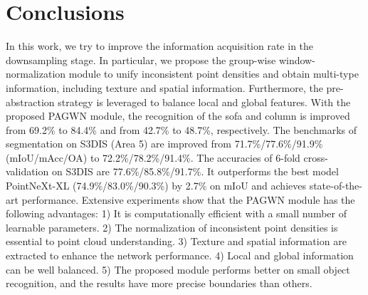 \documentclass[10pt,twocolumn,letterpaper]{article}
\begin{document}
\section{Conclusions}
    \label{sec:4}
    In this work, we try to improve the information acquisition rate in the downsampling stage.
    In particular, we propose the group-wise window-normalization module to unify inconsistent point densities and obtain multi-type information, including texture and spatial information.
    Furthermore, the pre-abstraction strategy is leveraged to balance local and global features.
    With the proposed PAGWN module, the recognition of the sofa and column is improved from 69.2\% to 84.4\% and from 42.7\% to 48.7\%, respectively.
    The benchmarks of segmentation on S3DIS (Area 5) are improved from 71.7\%/77.6\%/91.9\% (mIoU/mAcc/OA) to 72.2\%/78.2\%/91.4\%.
    The accuracies of 6-fold cross-validation on S3DIS are 77.6\%/85.8\%/91.7\%.
    It outperforms the best model PointNeXt-XL \cite{45https://doi.org/10.48550/arxiv.2206.04670} (74.9\%/83.0\%/90.3\%) by 2.7\% on mIoU and achieves state-of-the-art performance.
    Extensive experiments show that the PAGWN module has the following advantages:
    1) It is computationally efficient with a small number of learnable parameters.
    2) The normalization of inconsistent point densities is essential to point cloud understanding.
    3) Texture and spatial information are extracted to enhance the network performance.
    4) Local and global information can be well balanced.
    5) The proposed module performs better on small object recognition, and the results have more precise boundaries than others.


{\small


}
\end{document}

